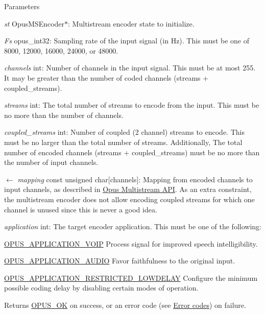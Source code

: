 \begin{DoxyParams}{Parameters}
\item[{\em st}]{\ttfamily OpusMSEncoder$\ast$}: Multistream encoder state to initialize. \item[{\em Fs}]{\ttfamily opus\_\-int32}: Sampling rate of the input signal (in Hz). This must be one of 8000, 12000, 16000, 24000, or 48000. \item[{\em channels}]{\ttfamily int}: Number of channels in the input signal. This must be at most 255. It may be greater than the number of coded channels ({\ttfamily streams + coupled\_\-streams}). \item[{\em streams}]{\ttfamily int}: The total number of streams to encode from the input. This must be no more than the number of channels. \item[{\em coupled\_\-streams}]{\ttfamily int}: Number of coupled (2 channel) streams to encode. This must be no larger than the total number of streams. Additionally, The total number of encoded channels ({\ttfamily streams + coupled\_\-streams}) must be no more than the number of input channels. \item[\mbox{$\leftarrow$} {\em mapping}]{\ttfamily const unsigned char\mbox{[}channels\mbox{]}}: Mapping from encoded channels to input channels, as described in \hyperlink{group__opus__multistream}{Opus Multistream API}. As an extra constraint, the multistream encoder does not allow encoding coupled streams for which one channel is unused since this is never a good idea. \item[{\em application}]{\ttfamily int}: The target encoder application. This must be one of the following: 
\begin{DoxyDescription}
\item[\hyperlink{group__opus__ctlvalues_ga07884aa018303a419d1f7acb2f3fa669}{OPUS\_\-APPLICATION\_\-VOIP} ]Process signal for improved speech intelligibility. 
\item[\hyperlink{group__opus__ctlvalues_ga5909f7cb35c04f1110026c6889edd345}{OPUS\_\-APPLICATION\_\-AUDIO} ]Favor faithfulness to the original input. 
\item[\hyperlink{group__opus__ctlvalues_ga592232fb39db60c1369989c5c5d19a07}{OPUS\_\-APPLICATION\_\-RESTRICTED\_\-LOWDELAY} ]Configure the minimum possible coding delay by disabling certain modes of operation. 
\end{DoxyDescription}\end{DoxyParams}
\begin{DoxyReturn}{Returns}
\hyperlink{group__opus__errorcodes_gaa44cf8a185e1b5cb940ef63eb4f02d21}{OPUS\_\-OK} on success, or an error code (see \hyperlink{group__opus__errorcodes}{Error codes}) on failure. 
\end{DoxyReturn}
